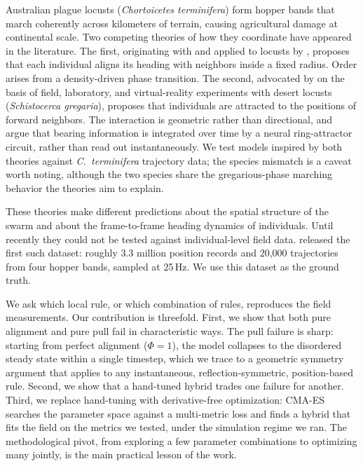 \documentclass[11pt]{article}
\begin{document}
Australian plague locusts (\textit{Chortoicetes terminifera}) form
hopper bands that march coherently across kilometers of terrain, causing
agricultural damage at continental scale. Two competing theories of how
they coordinate have appeared in the literature. The first, originating
with \citet{vicsek1995} and applied to locusts by \citet{buhl2006},
proposes that each individual aligns its heading with neighbors inside a
fixed radius. Order arises from a density-driven phase transition. The
second, advocated by \citet{sayin2025} on the basis of field, laboratory,
and virtual-reality experiments with desert locusts (\textit{Schistocerca
gregaria}), proposes that individuals are attracted to the positions of
forward neighbors. The interaction is geometric rather than directional,
and \citet{sayin2025} argue that bearing information is integrated over
time by a neural ring-attractor circuit, rather than read out
instantaneously. We test models inspired by both theories against
\textit{C.~terminifera} trajectory data; the species mismatch is a caveat
worth noting, although the two species share the gregarious-phase marching
behavior the theories aim to explain.

These theories make different predictions about the spatial structure of
the swarm and about the frame-to-frame heading dynamics of individuals.
Until recently they could not be tested against individual-level field
data. \citet{weinburd2024} released the first such dataset: roughly 3.3
million position records and 20{,}000 trajectories from four hopper bands,
sampled at 25\,Hz. We use this dataset as the ground truth.

We ask which local rule, or which combination of rules, reproduces the
field measurements. Our contribution is threefold. First, we show that
both pure alignment and pure pull fail in characteristic ways. The pull
failure is sharp: starting from perfect alignment ($\Phi = 1$), the model
collapses to the disordered steady state within a single timestep, which
we trace to a geometric symmetry argument that applies to any
instantaneous, reflection-symmetric, position-based rule. Second, we
show that a hand-tuned hybrid trades one failure for another. Third, we
replace hand-tuning with derivative-free optimization: CMA-ES searches
the parameter space against a multi-metric loss and finds a hybrid that
fits the field on the metrics we tested, under the simulation regime we
ran. The methodological pivot, from exploring a few parameter
combinations to optimizing many jointly, is the main practical lesson of
the work.
\end{document}
